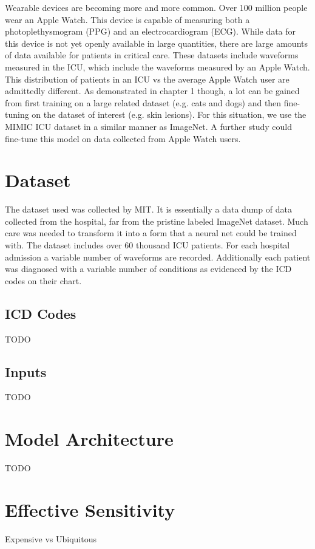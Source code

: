 Wearable devices are becoming more and more common.  Over 100 million people wear an Apple Watch.  This device is capable of measuring both a photoplethysmogram (PPG) and an electrocardiogram (ECG).  While data for this device is not yet openly available in large quantities, there are large amounts of data available for patients in critical care.  These datasets include waveforms measured in the ICU, which include the waveforms measured by an Apple Watch.  This distribution of patients in an ICU vs the average Apple Watch user are admittedly different.  As demonstrated in chapter 1 though, a lot can be gained from first training on a large related dataset (e.g. cats and dogs) and then fine-tuning on the dataset of interest (e.g. skin lesions).  For this situation, we use the MIMIC ICU dataset in a similar manner as ImageNet.  A further study could fine-tune this model on data collected from Apple Watch users.

\section{Dataset}
The dataset used was collected by MIT.  It is essentially a data dump of data collected from the hospital, far from the pristine labeled ImageNet dataset.  Much care was needed to transform it into a form that a neural net could be trained with.  The dataset includes over 60 thousand ICU patients.  For each hospital admission a variable number of waveforms are recorded.  Additionally each patient was diagnosed with a variable number of conditions as evidenced by the ICD codes on their chart.

\subsection{ICD Codes}
TODO

\subsection{Inputs}
TODO

\section{Model Architecture}
TODO

\section{Effective Sensitivity}
Expensive vs Ubiquitous

